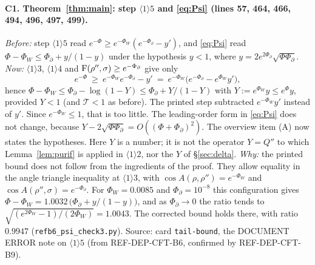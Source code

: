 \documentclass[11pt]{article}
\begin{document}
\paragraph{C1. Theorem~\ref{thm:main}: step $\langle1\rangle5$ and \eqref{eq:Psi} (lines 57, 464,
466, 494, 496, 497, 499).}
\emph{Before:} step $\langle1\rangle5$ read $e^{-\Phi}\ge e^{-\Phi_W}(e^{-\Phi_\partial}-y')$, and
\eqref{eq:Psi} read $\Phi-\Phi_W\le\Phi_\partial+y/(1-y)$ under the hypothesis $y<1$, where
$y=2e^{2\Phi_\partial}\sqrt{\Phi\Phi_\partial}$.
\emph{Now:} $\langle1\rangle3$, $\langle1\rangle4$ and $\operatorname{F}(\rho'',\sigma)\ge e^{-\Phi_\partial}$
give only
\[
 e^{-\Phi}\ \ge\ e^{-\Phi_W}e^{-\Phi_\partial}-y'\ =\ e^{-\Phi_W}\bigl(e^{-\Phi_\partial}-e^{\Phi_W}y'\bigr),
\]
hence $\Phi-\Phi_W\le\Phi_\partial-\log(1-Y)\le\Phi_\partial+Y/(1-Y)$ with $Y:=e^{\Phi_W}y\le e^{\Phi}y$,
provided $Y<1$ (and $\mathcal T<1$ as before).  The printed step subtracted $e^{-\Phi_W}y'$ instead
of $y'$.  Since $e^{-\Phi_W}\le1$, that is too little.  The leading-order form in \eqref{eq:Psi}
does not change, because $Y-2\sqrt{\Phi\Phi_\partial}=O((\Phi+\Phi_\partial)^2)$.  The overview item
(A) now states the hypotheses.  Here $Y$ is a number; it is not the operator $Y=Q''$ to which
Lemma~\ref{lem:purif} is applied in $\langle1\rangle2$, nor the $Y$ of \S\ref{sec:delta}.
\emph{Why:} the printed bound does not follow from the ingredients of the proof.  They allow
equality in the angle triangle inequality at $\langle1\rangle3$, with
$\cos A(\rho,\rho'')=e^{-\Phi_W}$ and $\cos A(\rho'',\sigma)=e^{-\Phi_\partial}$.  For
$\Phi_W=0.0085$ and $\Phi_\partial=10^{-8}$ this configuration gives
$\Phi-\Phi_W=1.0032\,\bigl(\Phi_\partial+y/(1-y)\bigr)$, and as $\Phi_\partial\to0$ the ratio tends
to $\sqrt{(e^{2\Phi_W}-1)/(2\Phi_W)}=1.0043$.  The corrected bound holds there, with ratio $0.9947$
(\texttt{refb6\_psi\_check3.py}).  Source: card \texttt{tail-bound}, the DOCUMENT ERROR note on
$\langle1\rangle5$ (from REF-DEP-CFT-B6, confirmed by REF-DEP-CFT-B9).
\end{document}
